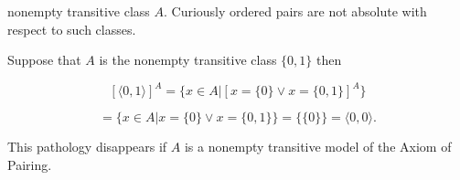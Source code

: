 nonempty transitive class $A$. Curiously ordered pairs are not absolute with respect to such classes.

Suppose that $A$ is the nonempty transitive class $\{0, 1\}$ then

$$[\langle 0, 1 \rangle]^A = \{x \in A | [x = \{0\} \vee x = \{0, 1\}]^A\}$$

$$= \{x \in A | x = \{0\} \vee x = \{0, 1\}\} = \{\{0\}\} = \langle 0, 0 \rangle.$$

This pathology disappears if $A$ is a nonempty transitive model of the Axiom of Pairing.
